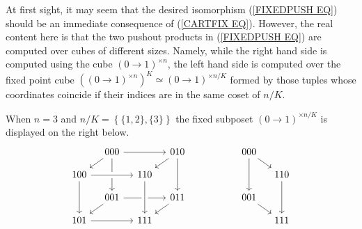 \documentclass[a4paper,10pt]{article}%
\begin{document}
At first sight, it may seem that 
the desired isomorphism
(\ref{FIXEDPUSH EQ})
should be an immediate consequence of (\ref{CARTFIX EQ}). However, the real content here is that the two pushout products in 
(\ref{FIXEDPUSH EQ}) are computed over cubes of different sizes. Namely, while the right hand side is computed using the cube
$(0 \to 1)^{\times n}$,
the left hand side is computed over the fixed point cube
$\left((0 \to 1)^{\times n} \right)^K
\simeq (0 \to 1)^{\times n/K}$ formed by those tuples
whose coordinates coincide if their indices are in the same coset of $n/K$.







\begin{example}
When $n=3$ and $n/K = \left\{\{1,2\},\{3\}\right\}$ the fixed subposet $(0 \to 1)^{\times n/K}$ is displayed on the right below.
\[
\begin{tikzcd}[column sep=1em, row sep=1em]
	& 000 \ar{rr} \ar{ld} \ar{dd} && 010 \ar{ld} \ar{dd}&
	&&&& 000 \ar{dd} \ar{rd}
\\
	100 \ar[crossing over]{rr} \ar{dd} && 110 &&
	&&&& & 110 \ar{dd}
\\
	& 001 \ar{rr} \ar{ld} && 011 \ar{ld}&
	&&&& 001 \ar{rd}
\\
	101 \ar{rr} && 111 \ar[leftarrow,crossing over]{uu} &&
	&&&& & 111 
\end{tikzcd}
\]
\end{example}


\end{document}
